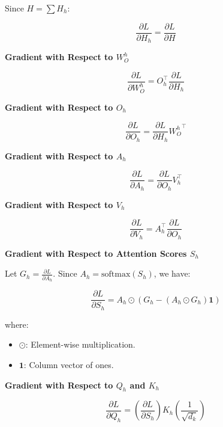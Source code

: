 \documentclass{article}
\begin{document}
Since $H = \sum H_h$:

\begin{equation}
    \frac{\partial L}{\partial H_h} = \frac{\partial L}{\partial H}
\end{equation}

\textbf{Gradient with Respect to $W_O^h$}

\begin{equation}
    \frac{\partial L}{\partial W_O^h} = O_h^\top \frac{\partial L}{\partial H_h}
\end{equation}

\textbf{Gradient with Respect to $O_h$}

\begin{equation}
    \frac{\partial L}{\partial O_h} = \frac{\partial L}{\partial H_h} {W_O^h}^\top
\end{equation}

\textbf{Gradient with Respect to $A_h$}

\begin{equation}
    \frac{\partial L}{\partial A_h} = \frac{\partial L}{\partial O_h} V_h^\top
\end{equation}

\textbf{Gradient with Respect to $V_h$}

\begin{equation}
    \frac{\partial L}{\partial V_h} = A_h^\top \frac{\partial L}{\partial O_h}
\end{equation}

\textbf{Gradient with Respect to Attention Scores $S_h$}

Let $G_h = \frac{\partial L}{\partial A_h}$. Since $A_h = \text{softmax}(S_h)$, we have:

\begin{equation}
    \frac{\partial L}{\partial S_h} = A_h \odot \left( G_h - (A_h \odot G_h) \mathbf{1} \right)
\end{equation}

where:

\begin{itemize}
    \item $\odot$: Element-wise multiplication.
    \item $\mathbf{1}$: Column vector of ones.
\end{itemize}

\textbf{Gradient with Respect to $Q_h$ and $K_h$}

\begin{equation}
    \frac{\partial L}{\partial Q_h} = \left( \frac{\partial L}{\partial S_h} \right) K_h \left( \frac{1}{\sqrt{d_k}} \right)
\end{equation}
\end{document}
